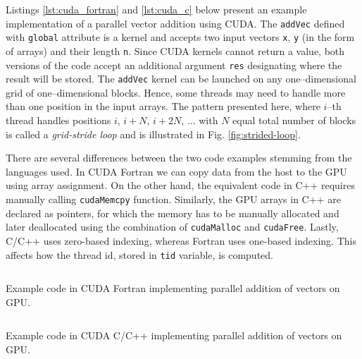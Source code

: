 \begin{example}
  Listings \ref{lst:cuda_fortran} and \ref{lst:cuda_c} below present an example
  implementation of a parallel vector addition using CUDA. The \texttt{addVec}
  defined with \texttt{global} attribute is a kernel and accepts two input
  vectors \texttt{x}, \texttt{y} (in the form of arrays) and their length
  \texttt{n}. Since CUDA kernels cannot return a value, both versions of the code
  accept an additional argument \texttt{res} designating where the result will be
  stored. The \texttt{addVec} kernel can be launched on any one--dimensional grid
  of one--dimensional blocks. Hence, some threads may need to handle more than
  one position in the input arrays. The pattern presented here, where $i$--th
  thread handles positions $i$, $i+N$, $i+2N$, $\ldots$ with $N$ equal total
  number of blocks is called a \emph{grid-stride loop} and is illustrated in Fig.
  \ref{fig:strided-loop}.

  There are several differences between the two code examples stemming from the
  languages used. In CUDA Fortran we can copy data from the host to the GPU using
  array assignment. On the other hand, the equivalent code in C++ requires
  manually calling \texttt{cudaMemcpy} function. Similarly, the GPU arrays in C++
  are declared as pointers, for which the memory has to be manually allocated and
  later deallocated using the combination of \texttt{cudaMalloc} and
  \texttt{cudaFree}. Lastly, C/C++ uses zero-based indexing, whereas Fortran uses
  one-based indexing. This affects how the thread id, stored in \texttt{tid}
  variable, is computed.

  \begin{listing}
    \inputminted{fortran}{code/cuda_fortran.cuf}
    \caption{Example code in CUDA Fortran implementing parallel addition of vectors on GPU.}
    \label{lst:cuda_fortran}
  \end{listing}

  \begin{listing}
    \inputminted[fontsize=\footnotesize]{cuda}{code/cuda_c.cu}
    \caption{Example code in CUDA C/C++ implementing parallel addition of vectors on GPU.}
    \label{lst:cuda_c}
  \end{listing}


\end{example}
